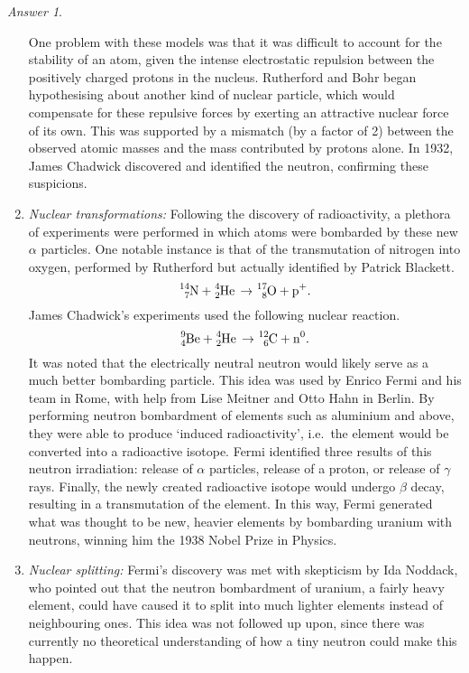 \documentclass[11pt]{article}
\theoremstyle{remark}
\newtheorem*{answer}{Answer}
\begin{document}
\begin{answer}
\begin{enumerate}
            One problem with these models was that it was difficult to account for
            the stability of an atom, given the intense electrostatic repulsion
            between the positively charged protons in the nucleus. Rutherford and
            Bohr began hypothesising about another kind of nuclear particle, which
            would compensate for these repulsive forces by exerting an attractive
            nuclear force of its own. This was supported by a mismatch (by a factor
            of 2) between the observed atomic masses and the mass contributed by
            protons alone. In 1932, James Chadwick discovered and identified the
            neutron, confirming these suspicions.


            \item \textit{Nuclear transformations:} Following the discovery of
            radioactivity, a plethora of experiments were performed in which atoms
            were bombarded by these new $\alpha$ particles. One notable instance is
            that of the transmutation of nitrogen into oxygen, performed by
            Rutherford but actually identified by Patrick Blackett. \[
                \ce{^14_7N + ^4_2He \to ^17_8O + p^+}.
            \] James Chadwick's experiments used the following nuclear reaction. \[
                \ce{^9_4Be + ^4_2He \to ^12_6C + n^0}.
            \] It was noted that the electrically neutral neutron would likely serve
            as a much better bombarding particle. This idea was used by Enrico Fermi
            and his team in Rome, with help from Lise Meitner and Otto Hahn in
            Berlin. By performing neutron bombardment of elements such as aluminium
            and above, they were able to produce `induced radioactivity', i.e.\ the
            element would be converted into a radioactive isotope. Fermi identified
            three results of this neutron irradiation: release of $\alpha$ particles,
            release of a proton, or release of $\gamma$ rays. Finally, the newly
            created radioactive isotope would undergo $\beta$ decay, resulting in a
            transmutation of the element. In this way, Fermi generated what was
            thought to be new, heavier elements by bombarding uranium with neutrons,
            winning him the 1938 Nobel Prize in Physics.


            \item \textit{Nuclear splitting:} Fermi's discovery was met with
            skepticism by Ida Noddack, who pointed out that the neutron bombardment
            of uranium, a fairly heavy element, could have caused it to split into
            much lighter elements instead of neighbouring ones. This idea was not
            followed up upon, since there was currently no theoretical understanding
            of how a tiny neutron could make this happen. 


\end{enumerate}
\end{answer}
\end{document}

